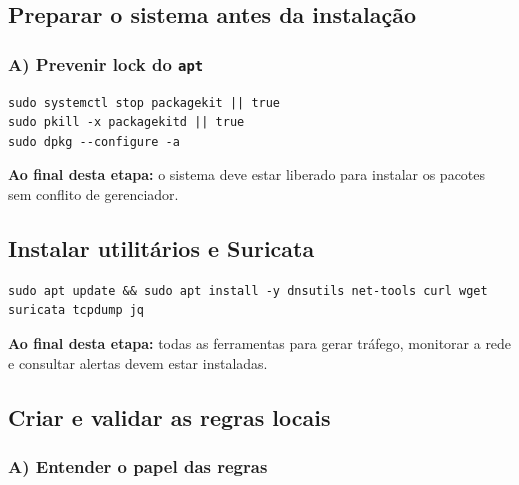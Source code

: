 \subsection{Preparar o sistema antes da instalação}

\subsubsection*{A) Prevenir lock do \texttt{apt}}

\begin{lstlisting}
sudo systemctl stop packagekit || true
sudo pkill -x packagekitd || true
sudo dpkg --configure -a
\end{lstlisting}


\begin{notebox}
\textbf{Ao final desta etapa:} o sistema deve estar liberado para instalar os pacotes sem conflito de gerenciador.
\end{notebox}

\subsection{Instalar utilitários e Suricata}

\begin{lstlisting}
sudo apt update && sudo apt install -y dnsutils net-tools curl wget suricata tcpdump jq
\end{lstlisting}


\begin{notebox}
\textbf{Ao final desta etapa:} todas as ferramentas para gerar tráfego, monitorar a rede e consultar alertas devem estar instaladas.
\end{notebox}

\subsection{Criar e validar as regras locais}

\subsubsection*{A) Entender o papel das regras}

